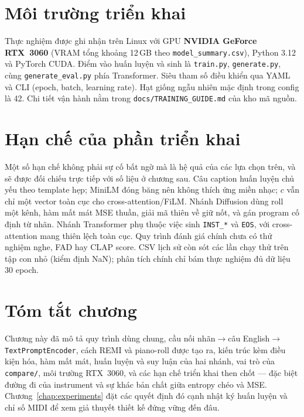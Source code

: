 \section{Môi trường triển khai}
\label{sec:ch3-env}

Thực nghiệm được ghi nhận trên Linux với GPU \textbf{NVIDIA GeForce RTX~3060} (VRAM tổng khoảng 12\,GB theo \texttt{model\_summary.csv}), Python 3.12 và PyTorch CUDA. Điểm vào huấn luyện và sinh là \texttt{train.py}, \texttt{generate.py}, cùng \texttt{generate\_eval.py} phía Transformer. Siêu tham số điều khiển qua YAML và CLI (epoch, batch, learning rate). Hạt giống ngẫu nhiên mặc định trong config là 42. Chi tiết vận hành nằm trong \texttt{docs/TRAINING\_GUIDE.md} của kho mã nguồn.

\section{Hạn chế của phần triển khai}
\label{sec:ch3-limits}

Một số hạn chế không phải sự cố bất ngờ mà là hệ quả của các lựa chọn trên, và sẽ được đối chiếu trực tiếp với số liệu ở chương sau. Câu caption huấn luyện chủ yếu theo template hẹp; MiniLM đóng băng nên không thích ứng miền nhạc; $c$ vẫn chỉ một vector toàn cục cho cross-attention/FiLM. Nhánh Diffusion dùng roll một kênh, hàm mất mát MSE thuần, giải mã thiên về giữ nốt, và gán program cố định từ nhãn. Nhánh Transformer phụ thuộc việc sinh \texttt{INST\_*} và \texttt{EOS}, với cross-attention mang thiên lệch toàn cục. Quy trình đánh giá chính chưa có thử nghiệm nghe, FAD hay CLAP score. CSV lịch sử còn sót các lần chạy thử trên tập con nhỏ (kiểm định NaN); phân tích chính chỉ bám thực nghiệm đủ dữ liệu 30 epoch.

\section*{Tóm tắt chương}

Chương này đã mô tả quy trình dùng chung, cầu nối nhãn$\rightarrow$câu English$\rightarrow$\texttt{TextPromptEncoder}, cách REMI và piano-roll được tạo ra, kiến trúc kèm điều kiện hóa, hàm mất mát, huấn luyện và suy luận của hai nhánh, vai trò của \texttt{compare/}, môi trường RTX~3060, và các hạn chế triển khai then chốt --- đặc biệt đường đi của instrument và sự khác bản chất giữa entropy chéo và MSE. Chương~\ref{chap:experiments} đặt các quyết định đó cạnh nhật ký huấn luyện và chỉ số MIDI để xem giả thuyết thiết kế đứng vững đến đâu.
